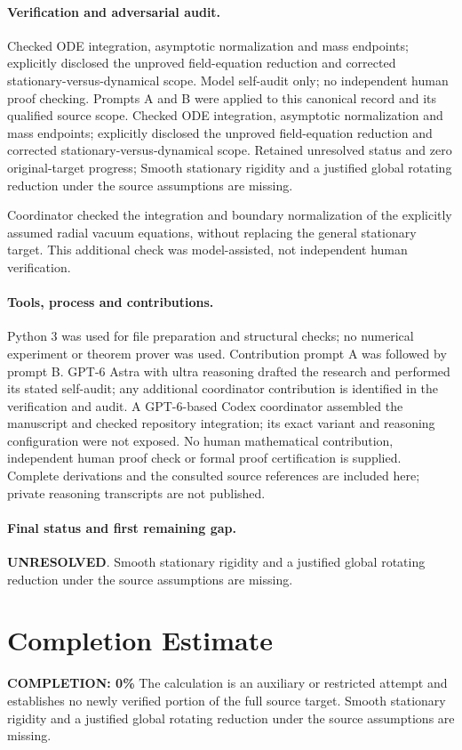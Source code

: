 \documentclass[11pt]{article}
\begin{document}
\paragraph{Verification and adversarial audit.}
Checked ODE integration, asymptotic normalization and mass endpoints; explicitly disclosed the unproved field-equation reduction and corrected stationary-versus-dynamical scope. Model self-audit only; no independent human proof checking. Prompts A and B were applied to this canonical record and its qualified source scope. Checked ODE integration, asymptotic normalization and mass endpoints; explicitly disclosed the unproved field-equation reduction and corrected stationary-versus-dynamical scope. Retained unresolved status and zero original-target progress; Smooth stationary rigidity and a justified global rotating reduction under the source assumptions are missing.

Coordinator checked the integration and boundary normalization of the explicitly assumed radial vacuum equations, without replacing the general stationary target. This additional check was model-assisted, not independent human verification.

\paragraph{Tools, process and contributions.}
Python 3 was used for file preparation and structural checks; no numerical experiment or theorem prover was used. Contribution prompt A was followed by prompt B. GPT-6 Astra with ultra reasoning drafted the research and performed its stated self-audit; any additional coordinator contribution is identified in the verification and audit. A GPT-6-based Codex coordinator assembled the manuscript and checked repository integration; its exact variant and reasoning configuration were not exposed. No human mathematical contribution, independent human proof check or formal proof certification is supplied. Complete derivations and the consulted source references are included here; private reasoning transcripts are not published.

\paragraph{Final status and first remaining gap.}
\textbf{UNRESOLVED}. Smooth stationary rigidity and a justified global rotating reduction under the source assumptions are missing.

\section{Completion Estimate}
\noindent\textbf{COMPLETION: 0\%}
The calculation is an auxiliary or restricted attempt and establishes no newly verified portion of the full source target. Smooth stationary rigidity and a justified global rotating reduction under the source assumptions are missing.
\end{document}
